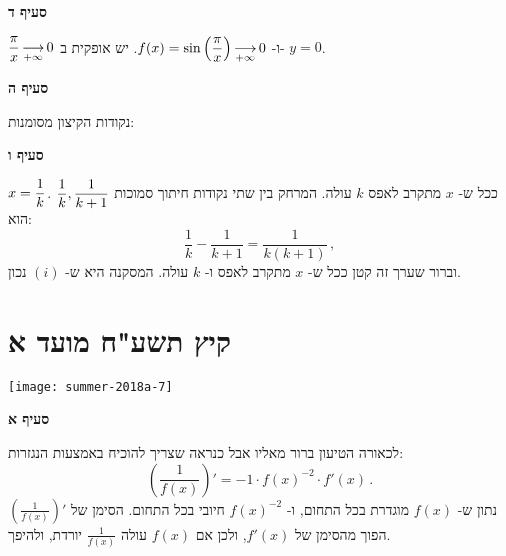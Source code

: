 \textbf{סעיף ד}

$\displaystyle\frac{\pi}{x} \mathop{\longrightarrow}\limits_{+\infty} 0$
ו-%
$f(x)=\sin\left(\displaystyle\frac{\pi}{x}\right)\mathop{\longrightarrow}\limits_{+\infty} 0$.
יש
\asm{}
אופקית ב-%
$y=0$.

\textbf{סעיף ה}

נקודות הקיצון מסומנות:
\begin{center}
\end{center}

\vspace{-2ex}

\textbf{סעיף ו}

$x=\displaystyle\frac{1}{k}$.
ככל ש-%
$x$
מתקרב לאפס
$k$
עולה. המרחק בין שתי נקודות חיתוך סמוכות
$\displaystyle\frac{1}{k},\displaystyle\frac{1}{k+1}$
הוא:
\[
\frac{1}{k}-\frac{1}{k+1}=\frac{1}{k(k+1)}\,,
\]
וברור שערך זה קטן ככל ש-%
$x$
מתקרב לאפס ו-%
$k$
עולה. המסקנה היא ש-%
$(i)$
נכון.

\np



\section{קיץ תשע"ח מועד א}

\begin{center}
\texttt{[image: summer-2018a-7]}
\end{center}

\vspace{-2ex}

\textbf{סעיף א}

לכאורה הטיעון ברור מאליו אבל כנראה שצריך להוכיח באמצעות הנגזרות:
\[
\left(\frac{1}{f(x)}\right)'=-1\cdot f(x)^{-2} \cdot f'(x)\,.
\]
נתון ש-%
$f(x)$
מוגדרת בכל התחום, ו-%
$f(x)^{-2}$
חיובי בכל התחום. הסימן של
$\left(\frac{1}{f(x)}\right)'$
הפוך מהסימן של
$f'(x)$,
ולכן אם
$f(x)$
עולה 
$\frac{1}{f(x)}$
יורדת, ולהיפך.

